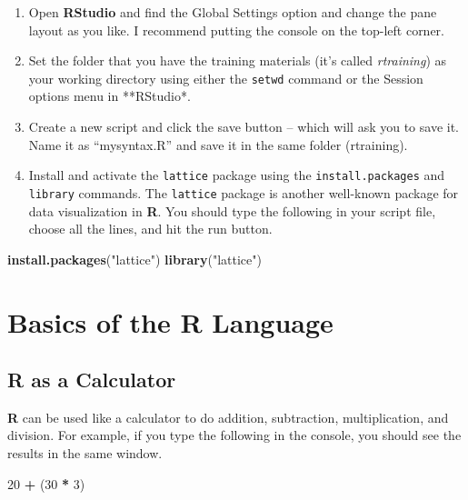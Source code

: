 \documentclass[]{book}
\newenvironment{Shaded}{\begin{snugshade}}{\end{snugshade}}
\newcommand{\DecValTok}[1]{\textcolor[rgb]{0.00,0.00,0.81}{#1}}
\newcommand{\KeywordTok}[1]{\textcolor[rgb]{0.13,0.29,0.53}{\textbf{#1}}}
\newcommand{\NormalTok}[1]{#1}
\newcommand{\OperatorTok}[1]{\textcolor[rgb]{0.81,0.36,0.00}{\textbf{#1}}}
\newcommand{\StringTok}[1]{\textcolor[rgb]{0.31,0.60,0.02}{#1}}
\providecommand{\tightlist}{%
  \setlength{\itemsep}{0pt}\setlength{\parskip}{0pt}}
\begin{document}
\begin{enumerate}
\def\labelenumi{\arabic{enumi}.}
\tightlist
\item
  Open \textbf{RStudio} and find the Global Settings option and change the pane layout as you like. I recommend putting the console on the top-left corner.
\item
  Set the folder that you have the training materials (it's called \emph{rtraining}) as your working directory using either the \texttt{setwd} command or the Session options menu in **RStudio*.
\item
  Create a new script and click the save button -- which will ask you to save it. Name it as ``mysyntax.R'' and save it in the same folder (rtraining).\\
\item
  Install and activate the \texttt{lattice} package using the \texttt{install.packages} and \texttt{library} commands. The \texttt{lattice} package \citep{R-lattice} is another well-known package for data visualization in \textbf{R}. You should type the following in your script file, choose all the lines, and hit the run button.
\end{enumerate}

\begin{Shaded}
\begin{Highlighting}[]
\KeywordTok{install.packages}\NormalTok{(}\StringTok{"lattice"}\NormalTok{)}
\KeywordTok{library}\NormalTok{(}\StringTok{"lattice"}\NormalTok{)}
\end{Highlighting}
\end{Shaded}

\hypertarget{basics-of-the-r-language}{%
\section{Basics of the R Language}\label{basics-of-the-r-language}}

\hypertarget{r-as-a-calculator}{%
\subsection{R as a Calculator}\label{r-as-a-calculator}}

\textbf{R} can be used like a calculator to do addition, subtraction, multiplication, and division. For example, if you type the following in the console, you should see the results in the same window.

\begin{Shaded}
\begin{Highlighting}[]
\DecValTok{20} \OperatorTok{+}\StringTok{ }\NormalTok{(}\DecValTok{30} \OperatorTok{*}\StringTok{ }\DecValTok{3}\NormalTok{)}
\end{Highlighting}
\end{Shaded}
\end{document}
